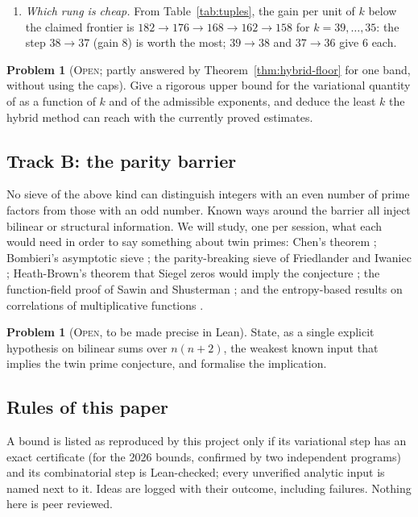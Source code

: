 \documentclass[11pt]{amsart}
\theoremstyle{definition}
\newtheorem{problem}[theorem]{Problem}
\theoremstyle{remark}
\newcommand{\lbl}[1]{\textup{\textsc{#1}}}
\begin{document}
\begin{enumerate}
($k\ge29$ at Stadlmann's level, $k\ge27$ at that of \cite{Cha26}), still
far from $49$ and $45$; it ignores the caps. A rigorous
dual certificate there would say how far one-band supports can go with the
present inputs, and which input (which Type~I/II/III range) is binding; the
constructions behind $186$ and $182$ are of a different kind and would need
their own dual bound.
\item \emph{Which rung is cheap.} From Table~\ref{tab:tuples}, the gain per
unit of $k$ below the claimed frontier is $182\to176\to168\to162\to158$
for $k=39,\dots,35$: the step $38\to37$ (gain $8$) is worth the most;
$39\to38$ and $37\to36$ give $6$ each.
\end{enumerate}

\begin{problem}[\lbl{Open}; partly answered by Theorem~\ref{thm:hybrid-floor} for one band, without using the caps]
Give a rigorous upper bound for the variational quantity of \cite{Sta26} as a
function of $k$ and of the admissible exponents, and deduce the least $k$ the
hybrid method can reach with the currently proved estimates.
\end{problem}

\subsection*{Track B: the parity barrier}
No sieve of the above kind can distinguish integers with an even number of
prime factors from those with an odd number. Known ways around the barrier
all inject bilinear or structural information. We will study, one per
session, what each would need in order to say something about twin primes:
Chen's theorem \cite{Che73}; Bombieri's asymptotic sieve \cite{Bom76}; the
parity-breaking sieve of Friedlander and Iwaniec \cite{FI98}; Heath-Brown's
theorem that Siegel zeros would imply the conjecture \cite{HB83}; the
function-field proof of Sawin and Shusterman \cite{SS22}; and the
entropy-based results on correlations of multiplicative functions
\cite{Tao16}.

\begin{problem}[\lbl{Open}, to be made precise in Lean]
State, as a single explicit hypothesis on bilinear sums over $n(n+2)$, the
weakest known input that implies the twin prime conjecture, and formalise the
implication.
\end{problem}

\subsection*{Rules of this paper}
A bound is listed as reproduced by this project only if its variational step
has an exact certificate (for the 2026 bounds, confirmed by two independent
programs) and its
combinatorial step is Lean-checked; every unverified analytic input is named
next to it. Ideas are
logged with their outcome, including failures. Nothing here is peer reviewed.
\end{document}
